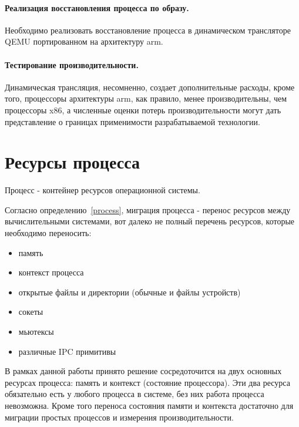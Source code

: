 \paragraph{Реализация восстановления процесса по образу.}

Необходимо реализовать восстановление процесса в динамическом трансляторе QEMU портированном на архитектуру arm.

\paragraph{Тестирование производительности.}

Динамическая трансляция, несомненно, создает дополнительные расходы, кроме того, процессоры архитектуры arm, как правило, менее производительны, чем процессоры x86, а численные оценки потерь производительности могут дать представление о границах применимости разрабатываемой технологии.

\section{Ресурсы процесса}

\begin{Def}\label{process}
Процесс - контейнер ресурсов операционной системы.
\end{Def}

Согласно определению~\ref{process}, миграция процесса - перенос ресурсов между вычислительными системами, вот далеко не полный перечень ресурсов, которые необходимо переносить:

\begin{itemize}

    \item память
    \item контекст процесса
    \item открытые файлы и директории (обычные и файлы устройств)
    \item сокеты
    \item мьютексы
    \item различные IPC примитивы

\end{itemize}

В рамках данной работы принято решение сосредоточится на двух основных ресурсах процесса: память и контекст (состояние процессора). Эти два ресурса обязательно есть у любого процесса в системе, без них работа процесса невозможна. Кроме того переноса состояния памяти и контекста достаточно для миграции простых процессов и измерения производительности.

